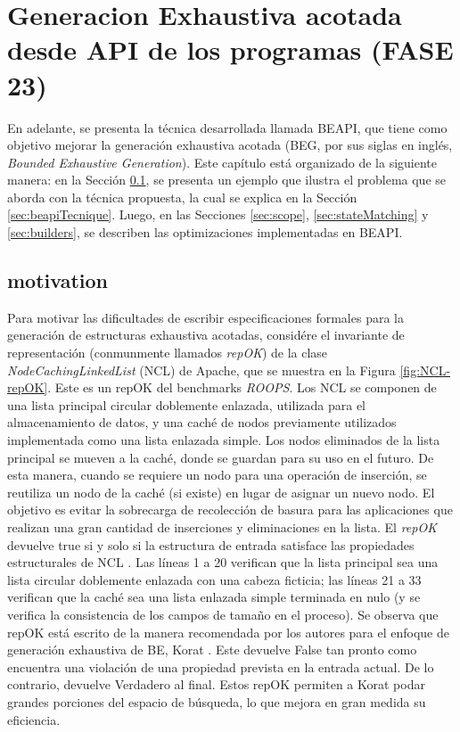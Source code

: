 \chapter*{Generacion Exhaustiva acotada desde API de los programas (FASE 23)}


\label{cap:beapi}

En adelante, se presenta la técnica  desarrollada llamada BEAPI, que tiene como objetivo mejorar la generación exhaustiva acotada (BEG, por sus siglas en inglés, \emph{Bounded Exhaustive Generation}). Este capítulo está organizado de la siguiente manera: en la Sección \ref{sec:motivation}, se presenta un ejemplo que ilustra el problema que se aborda con la técnica propuesta, la cual se explica en la Sección \ref{sec:beapiTecnique}. Luego, en las Secciones \ref{sec:scope}, \ref{sec:stateMatching} y \ref{sec:builders}, se describen las optimizaciones implementadas en BEAPI.


\section[Motivation]{motivation}
\label{sec:motivation}

Para motivar las dificultades de escribir especificaciones formales para la generación de estructuras exhaustiva acotadas,  considére el invariante de representación (conmunmente llamados \emph{repOK}) de la clase \emph{NodeCachingLinkedList} (NCL) de Apache, que se muestra en la Figura \ref{fig:NCL-repOK}. Este es un repOK del benchmarks \emph{ROOPS}. Los NCL se componen de una lista principal circular doblemente enlazada, utilizada para el almacenamiento de datos, y una caché de nodos previamente utilizados implementada como una lista enlazada simple. Los nodos eliminados de la lista principal se mueven a la caché, donde se guardan para su uso en el futuro. De esta manera, cuando se requiere un nodo para una operación de inserción, se reutiliza un nodo de la caché (si existe) en lugar de asignar un nuevo nodo. El objetivo es evitar la sobrecarga de recolección de basura para las aplicaciones que realizan una gran cantidad de inserciones y eliminaciones en la lista. El \emph{repOK} devuelve true si y solo si la estructura de entrada satisface las propiedades estructurales de NCL \cite{Liskov00}. Las líneas 1 a 20 verifican que la lista principal sea una lista circular doblemente enlazada con una cabeza ficticia; las líneas 21 a 33 verifican que la caché sea una lista enlazada simple terminada en nulo (y se verifica la consistencia de los campos de tamaño en el proceso). Se observa que repOK está escrito de la manera recomendada por los autores para el enfoque de generación exhaustiva de BE, \textsf{Korat} \cite{Boyapati02}. Este devuelve False tan pronto como encuentra una violación de una propiedad prevista en la entrada actual. De lo contrario, devuelve Verdadero al final. Estos repOK permiten a \textsf{Korat} podar grandes porciones del espacio de búsqueda, lo que mejora en gran medida su eficiencia.



